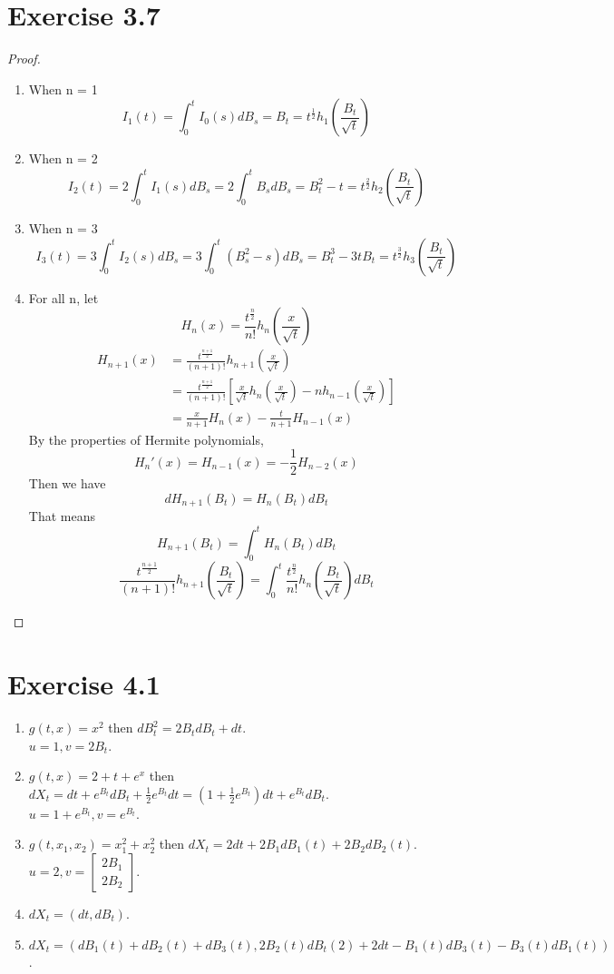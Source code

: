 \documentclass{article}
\begin{document}
\section*{Exercise 3.7}
	\begin{proof}
	\begin{enumerate}
		\item When n = 1
			$$I_1(t) = \int_0^t I_0(s)dB_s = B_t = t^{\frac{1}{2}}h_1\left(\frac{B_t}{\sqrt{t}}\right)$$
		\item When n = 2
			$$I_2(t) = 2\int_0^t I_1(s)dB_s = 2\int_0^t B_s dB_s = B_t^2 - t = t^{\frac{2}{2}}h_2\left(\frac{B_t}{\sqrt{t}}\right)$$
		\item When n = 3
			$$I_3(t) = 3\int_0^t I_2(s)dB_s = 3\int_0^t (B_s^2 - s)dB_s = B_t^3 - 3tB_t = t^{\frac{3}{2}}h_3\left(\frac{B_t}{\sqrt{t}}\right)$$
		\item For all n, let
		$$H_{n}(x) = \frac{t^{\frac{n}{2}}}{n!}h_n\left(\frac{x}{\sqrt{t}}\right)$$
		\begin{align*}
			H_{n+1}(x) &= \frac{t^{\frac{n+1}{2}}}{(n+1)!}h_{n+1}\left(\frac{x}{\sqrt{t}}\right)\\
			&=\frac{t^{\frac{n+1}{2}}}{(n+1)!}\left[\frac{x}{\sqrt{t}}h_n\left(\frac{x}{\sqrt{t}}\right) - nh_{n-1}\left(\frac{x}{\sqrt{t}}\right)\right]\\
			&=\frac{x}{n+1}H_n(x) - \frac{t}{n+1}H_{n-1}(x) 
		\end{align*}
		By the properties of Hermite polynomials,
		$$H_n'(x) = H_{n-1}(x) = -\frac{1}{2}H_{n-2}(x)$$
		Then we have $$dH_{n+1}(B_t) = H_n(B_t)dB_t$$
		That means$$H_{n+1}(B_t) = \int_0^t H_n(B_t)dB_t$$
		$$\frac{t^{\frac{n+1}{2}}}{(n+1)!}h_{n+1}\left(\frac{B_t}{\sqrt{t}}\right) = \int_0^t \frac{t^{\frac{n}{2}}}{n!}h_{n}\left(\frac{B_t}{\sqrt{t}}\right)dB_t$$
	\end{enumerate}
	\end{proof}

\section*{Exercise 4.1}
	\begin{enumerate}
		\item $g(t,x) = x^2$ then $dB_t^2 = 2B_tdB_t+dt$.\\
			$u = 1, v = 2B_t$.
		\item $g(t,x) = 2+t+e^x$ then $dX_t = dt + e^{B_t}dB_t + \frac{1}{2}e^{B_t}dt = (1+\frac{1}{2}e^{B_t})dt + e^{B_t}dB_t$.\\
			$u = 1+e^{B_t}, v = e^{B_t}$.
		\item $g(t,x_1,x_2) = x_1^2 + x_2^2$ then $dX_t = 2dt + 2B_1dB_1(t) + 2B_2dB_2(t)$.\\
			$u = 2, v = \begin{bmatrix}
				2B_1 \\
				2B_2
			\end{bmatrix}$.
		\item $dX_t = (dt, dB_t)$.
		\item $dX_t = (dB_1(t)+dB_2(t)+dB_3(t), 2B_2(t)dB_t(2)+2dt-B_1(t)dB_3(t)-B_3(t)dB_1(t))$.
	\end{enumerate}
\end{document}
